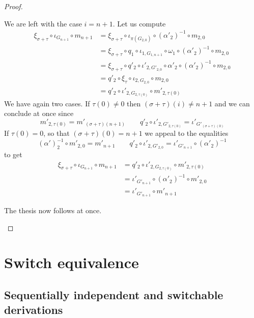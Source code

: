 \documentclass[a4paper,UKenglish,cleveref,pdftex, thm-restate,numberwithinsect]{lipics}
\begin{document}
\begin{proof}
\begin{itemize}
\begin{itemize}
	We are left with the case $i=n+1$. Let us compute
	\begin{align*}
		\xi_{\sigma+\tau}\circ \iota_{G_{n+1}} \circ m_{n+1} &= \xi_{\sigma+\tau} \circ \iota_{\pi(G_{2,0})} \circ (\alpha'_2)^{-1}\circ m_{2,0}\\&=\xi_{\sigma+\tau} \circ q_1\circ \iota_{1, G_{1,n+1}} \circ \omega_1 \circ (\alpha'_2)^{-1}\circ m_{2,0}\\&=\xi_{\sigma+\tau} \circ q'_2 \circ \iota'_{2,G'_{2,0}} \circ \alpha'_2 \circ (\alpha'_2)^{-1}\circ m_{2,0} \\&=q'_2 \circ \xi_\tau \circ \iota_{2, G_{2,0}} \circ m_{2,0}\\&=q'_2\circ \iota'_{2, G_{2,\tau(0)}} \circ m'_{2,\tau(0)}
	\end{align*}
	We have again two cases. If $\tau(0)\neq 0$ then $(\sigma+\tau)(i)\neq n+1$ and we can conclude at once since 
	\[m'_{2, \tau(0)}=m'_{(\sigma+\tau)(n+1)} \qquad q'_2\circ \iota'_{2, G'_{2,\tau(0)}}=
	\iota'_{G'_{(\sigma+\tau)(0)}}\] 
	If $\tau(0)=0$, so that  $(\sigma+\tau)(0)= n+1$ we appeal to the equalities
	\[(\alpha')^{-1}_2\circ m'_{2, 0}=m'_{n+1} \qquad q'_2\circ \iota'_{2, G'_{2, 0}}=
	\iota'_{G'_{n+1}}\circ (\alpha'_2)^{-1}\] 
	to get
	\begin{align*}
		\xi_{\sigma+\tau}\circ \iota_{G_{n+1}} \circ m_{n+1} &= q'_2\circ \iota'_{2, G_{2,\tau(0)}} \circ m'_{2,\tau(0)}\\&=	\iota'_{G'_{n+1}}\circ (\alpha'_2)^{-1}\circ m'_{2,0}\\&=\iota'_{G'_{n+1}}\circ  m'_{n+1}
	\end{align*}
\end{itemize}
The thesis now follows at once.	 \qedhere 
\end{itemize} \end{proof}
\fi 






\section{Switch equivalence }\label{sec:equi}



\subsection{Sequentially independent and switchable derivations }

\end{document}
